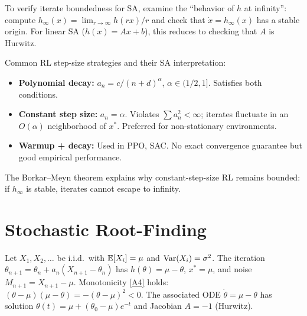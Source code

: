 \documentclass[11pt,a4paper]{article}
\begin{document}
\begin{keyresult}[title={Borkar--Meyn Stability Criterion}]
To verify iterate boundedness for SA, examine the ``behavior of $h$
at infinity'': compute $h_\infty(x) = \lim_{r \to \infty} h(rx)/r$
and check that $\dot{x} = h_\infty(x)$ has a stable origin. For
linear SA ($h(x) = Ax + b$), this reduces to checking that $A$ is
Hurwitz.
\end{keyresult}

\begin{rlconnection}[title={Step-Size Schedules in Practice}]
Common RL step-size strategies and their SA interpretation:
\begin{itemize}[nosep]
  \item \textbf{Polynomial decay:} $a_n = c/(n+d)^\alpha$,
    $\alpha \in (1/2,1]$. Satisfies both conditions.
  \item \textbf{Constant step size:} $a_n = \alpha$. Violates
    $\sum a_n^2 < \infty$; iterates fluctuate in an $O(\alpha)$
    neighborhood of $x^*$. Preferred for non-stationary environments.
  \item \textbf{Warmup + decay:} Used in PPO, SAC. No exact
    convergence guarantee but good empirical performance.
\end{itemize}
The Borkar--Meyn theorem explains why constant-step-size RL remains
bounded: if $h_\infty$ is stable, iterates cannot escape to infinity.
\end{rlconnection}



\section{Stochastic Root-Finding}
\label{sec:root-finding}

\begin{example}
\label{ex:mean-estimation}
Let $X_1, X_2, \ldots$ be i.i.d.\ with $\mathbb{E}[X_i] = \mu$ and
$\operatorname{Var}(X_i) = \sigma^2$. The iteration
$\theta_{n+1} = \theta_n + a_n(X_{n+1} - \theta_n)$ has
$h(\theta) = \mu - \theta$, $x^* = \mu$, and noise
$M_{n+1} = X_{n+1} - \mu$. Monotonicity \ref{A4} holds:
$(\theta - \mu)(\mu - \theta) = -(\theta-\mu)^2 < 0$. The
associated ODE $\dot{\theta} = \mu - \theta$ has solution
$\theta(t) = \mu + (\theta_0 - \mu)e^{-t}$ and Jacobian $A = -1$
(Hurwitz).
\end{example}
\end{document}

